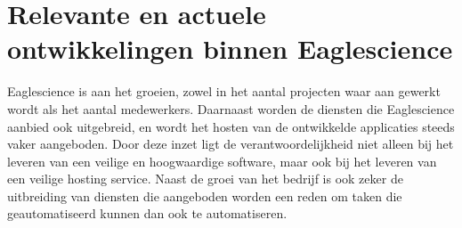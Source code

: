 \section{Relevante en actuele ontwikkelingen binnen Eaglescience}\label{sec:relevante-en-actuele-ontwikkelingen-binnen-eaglescience}
Eaglescience is aan het groeien, zowel in het aantal projecten waar aan gewerkt wordt als het aantal medewerkers.
Daarnaast worden de diensten die Eaglescience aanbied ook uitgebreid, en wordt het hosten van de ontwikkelde applicaties steeds vaker aangeboden.
Door deze inzet ligt de verantwoordelijkheid niet alleen bij het leveren van een veilige en hoogwaardige software, maar ook bij het leveren van een veilige hosting service.
Naast de groei van het bedrijf is ook zeker de uitbreiding van diensten die aangeboden worden een reden om taken die geautomatiseerd kunnen dan ook te automatiseren.
